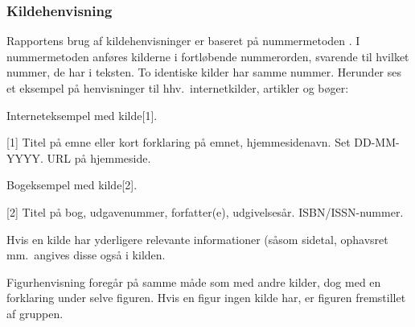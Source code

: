\subsubsection{Kildehenvisning}
Rapportens brug af kildehenvisninger er baseret på nummermetoden \cite{nummermetoden}. I nummermetoden anføres kilderne i fortløbende nummerorden, svarende til hvilket nummer, de har i teksten. To identiske kilder har samme nummer. Herunder ses et eksempel på henvisninger til hhv.\ internetkilder, artikler og bøger:

Interneteksempel med kilde[1].

[1] Titel på emne eller kort forklaring på emnet, hjemmesidenavn. Set DD-MM-YYYY. URL på hjemmeside.


Bogeksempel med kilde[2].

[2] Titel på bog, udgavenummer, forfatter(e), udgivelsesår. ISBN/ISSN-nummer.


Hvis en kilde har yderligere relevante informationer (såsom sidetal, ophavsret mm.\ angives disse også i kilden.


Figurhenvisning foregår på samme måde som med andre kilder, dog med en forklaring under selve figuren. Hvis en figur ingen kilde har, er figuren fremstillet af gruppen.
